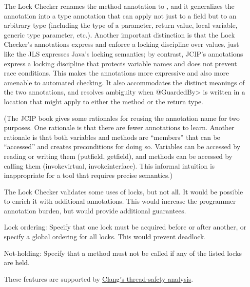 The Lock Checker renames the method annotation to
, and it generalizes the
 annotation into a type annotation
that can apply not just to a field but to an arbitrary type (including the
type of a parameter, return value, local variable, generic type parameter,
etc.).  Another important distinction is that the Lock Checker's
annotations express and enforce a locking discipline over values, just like
the JLS expresses Java's locking semantics; by contrast, JCIP's annotations
express a locking discipline that protects variable names and does not
prevent race conditions.
  This makes the annotations more expressive and also more amenable
to automated checking.  It also accommodates the distinct
meanings of the two annotations, and resolves ambiguity when \<@GuardedBy>
is written in a location that might apply to either the method or the
return type.

(The JCIP book gives some rationales for reusing the annotation name for
two purposes.  One rationale is
that there are fewer annotations to learn.  Another rationale is
that both variables and methods are ``members'' that can be ``accessed''
and  creates preconditions for doing so.
Variables can be accessed by reading or writing them (putfield, getfield),
and methods can be accessed by calling them (invokevirtual,
invokeinterface).  This informal intuition is
inappropriate for a tool that requires precise semantics.)




The Lock Checker validates some uses of locks, but not all.  It would be
possible to enrich it with additional annotations.  This would increase the
programmer annotation burden, but would provide additional guarantees.

Lock ordering:  Specify that one lock must be acquired before or after
another, or specify a global ordering for all locks.  This would prevent
deadlock.

Not-holding:  Specify that a method must not be called if any of the listed
locks are held.

These features are supported by
\href{http://clang.llvm.org/docs/ThreadSafetyAnalysis.html}{Clang's
  thread-safety analysis}.


